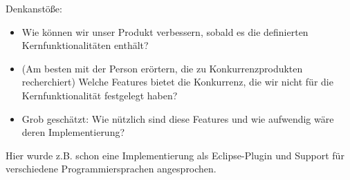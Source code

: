 Denkanstöße:
\begin{itemize}
\item Wie können wir unser Produkt verbessern, sobald es die definierten Kernfunktionalitäten enthält?
\item (Am besten mit der Person erörtern, die zu Konkurrenzprodukten recherchiert) Welche Features bietet die Konkurrenz, die wir nicht für die Kernfunktionalität festgelegt haben?
\item Grob geschätzt: Wie nützlich sind diese Features und wie aufwendig wäre deren Implementierung?
\end{itemize}
Hier wurde z.B. schon eine Implementierung als Eclipse-Plugin und Support für verschiedene Programmiersprachen angesprochen.
\nsecend

    
     


